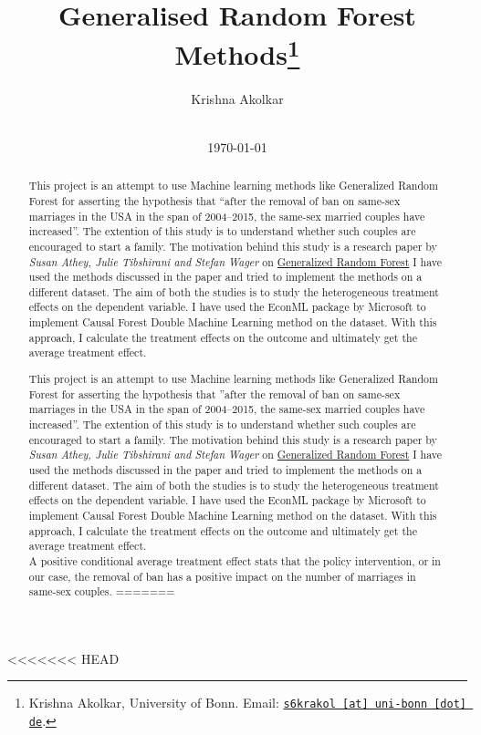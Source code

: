 \documentclass[11pt, a4paper, leqno]{article}
\begin{document}
\title{Generalised Random Forest Methods\thanks{Krishna Akolkar, University of Bonn. Email: \href{mailto:s6krakol@uni-bonn.de}{\nolinkurl{s6krakol [at] uni-bonn [dot] de}}.}}

\author{Krishna Akolkar}

\date{
    \\[1ex]
    \today
}
\maketitle
<<<<<<< HEAD
\begin{abstract} This project is an attempt to use Machine learning methods like Generalized Random Forest for asserting the hypothesis that
''after the removal of ban on same-sex marriages in the USA in the span of 2004--2015, the same-sex married couples have increased''.
The extention of this study is to understand whether such couples are encouraged to start a family.
The motivation behind this study is a research paper by \textit{Susan Athey, Julie Tibshirani and Stefan Wager} on \href{https://arxiv.org/pdf/1610.01271}{Generalized Random Forest}
I have used the methods discussed in the paper and tried to implement the methods on a different dataset.
The aim of both the studies is to study the heterogeneous treatment effects on the dependent variable.
I have used the EconML package by Microsoft to implement Causal Forest Double Machine Learning method on the dataset.
With this approach, I calculate the treatment effects on the outcome and ultimately get the average treatment effect.\\

A positive conditional average treatment effect stats that the policy intervention, or in our case, the removal of ban has a positive
impact on the number of marriages in same-sex couples.
=======


\begin{abstract}
    This project is an attempt to use Machine learning methods like Generalized Random Forest for asserting the hypothesis that
    ``after the removal of ban on same-sex marriages in the USA in the span of 2004--2015, the same-sex married couples have increased''.
    The extention of this study is to understand whether such couples are encouraged to start a family.
    The motivation behind this
    study is a research paper by \textit{Susan Athey, Julie Tibshirani and Stefan Wager} on \href{https://arxiv.org/pdf/1610.01271}{Generalized Random Forest}
    I have used the methods discussed in the paper and tried to implement the methods on a different dataset.
    The aim of both the studies is to study the heterogeneous treatment effects on the dependent variable.
    I have used the EconML package by Microsoft to implement Causal Forest Double Machine Learning method on the dataset.
    With this approach, I calculate the treatment effects on the outcome and ultimately get the average treatment effect.


\end{abstract}
\end{abstract}
\end{document}
